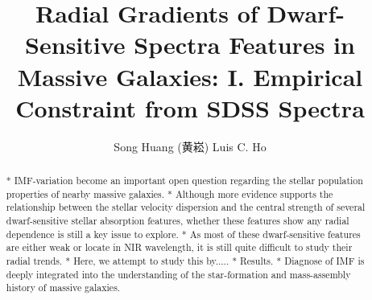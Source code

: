 \documentclass[preprint]{aastex}
\begin{document}
\begin{CJK*}{UTF8}{gbsn}


\title{Radial Gradients of Dwarf-Sensitive Spectra Features in Massive Galaxies: 
    I. Empirical Constraint from SDSS Spectra}

\author{Song Huang (黄崧) Luis C. Ho}
\date{}                                          







\begin{abstract}

* IMF-variation become an important open question regarding the stellar 
  population properties of nearby massive galaxies.  
* Although more evidence supports the relationship between the stellar 
  velocity dispersion and the central strength of several dwarf-sensitive 
  stellar absorption features, whether these features show any radial
  dependence is still a key issue to explore.  
* As most of these dwarf-sensitive features are either weak or locate in 
  NIR wavelength, it is still quite difficult to study their radial trends.
* Here, we attempt to study this by.....
* Results.   
* Diagnose of IMF is deeply integrated into the understanding of the 
  star-formation and mass-assembly history of massive galaxies. 
  
\end{abstract}



\end{CJK*}
\end{document}
